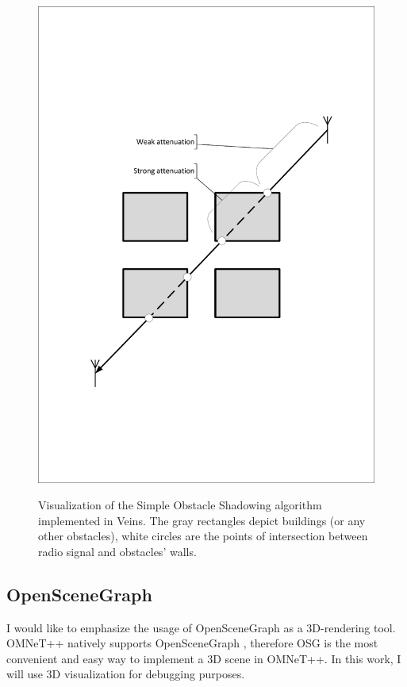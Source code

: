\documentclass[]{nsm-thesis}
\begin{document}
\begin{figure}
  	\caption{Visualization of the Simple Obstacle Shadowing algorithm implemented in Veins. The gray rectangles depict buildings (or any other obstacles), white circles are the points of intersection between radio signal and obstacles' walls.}
	\centering
	\includegraphics[width=1\textwidth]{figures/SimpleObstacleShadowing.pdf}
	\label{fig:SimpleObstacleShadowing}
\end{figure}

\subsection{OpenSceneGraph}

I would like to emphasize the usage of OpenSceneGraph \cite{osg} as a 3D-rendering tool.  OMNeT++ natively supports OpenSceneGraph \cite{omnetpposg}, therefore \ac{OSG} is the most convenient and easy way to implement a 3D scene in OMNeT++. In this work, I will use 3D visualization for debugging purposes.
\end{document}

